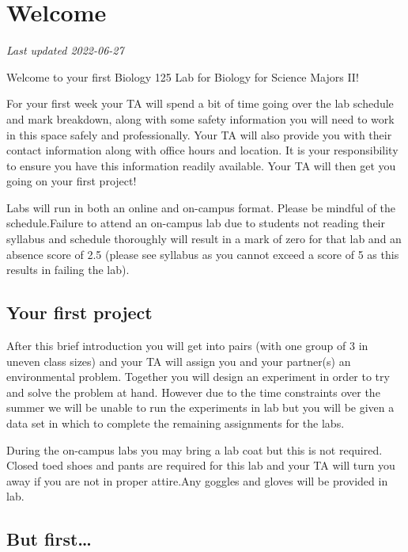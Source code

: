 \documentclass[
]{book}
\begin{document}
\hypertarget{welcome-1}{%
\chapter*{Welcome}\label{welcome-1}}

\emph{Last updated 2022-06-27}

Welcome to your first Biology 125 Lab for Biology for Science Majors II!

For your first week your TA will spend a bit of time going over the lab schedule and mark breakdown, along with some safety information you will need to work in this space safely and professionally. Your TA will also provide you with their contact information along with office hours and location. It is your responsibility to ensure you have this information readily available. Your TA will then get you going on your first project!

Labs will run in both an online and on-campus format. Please be mindful of the schedule.Failure to attend an on-campus lab due to students not reading their syllabus and schedule thoroughly will result in a mark of zero for that lab and an absence score of 2.5 (please see syllabus as you cannot exceed a score of 5 as this results in failing the lab).

\hypertarget{your-first-project}{%
\section*{Your first project}\label{your-first-project}}

After this brief introduction you will get into pairs (with one group of 3 in uneven class sizes) and your TA will assign you and your partner(s) an environmental problem. Together you will design an experiment in order to try and solve the problem at hand. However due to the time constraints over the summer we will be unable to run the experiments in lab but you will be given a data set in which to complete the remaining assignments for the labs.

During the on-campus labs you may bring a lab coat but this is not required. Closed toed shoes and pants are required for this lab and your TA will turn you away if you are not in proper attire.Any goggles and gloves will be provided in lab.

\hypertarget{but-first}{%
\section*{But first\ldots{}}\label{but-first}}
\end{document}
